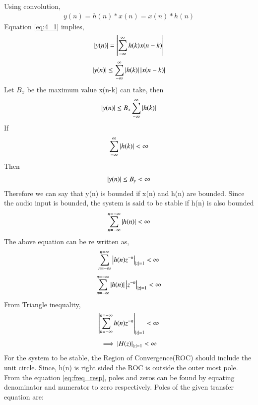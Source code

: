 \documentclass[journal,12pt,twocolumn]{IEEEtran}
\renewcommand\thesection{\arabic{section}}
\begin{document}
\begin{enumerate}[label=\thesection.\arabic*,ref=\thesection.\theenumi]
\begin{equation}
\label{eq:4_1}
\end{equation}
Using convolution,
\begin{align}
y(n)=h(n) * x(n) = x(n) * h(n)
\end{align}
Equation \eqref{eq:4_1} implies,
\begin{equation}
\left\vert y(n)\right\vert = \left\vert\sum_{-\infty}^{\infty} h(k)x(n-k)\right\vert
\end{equation}
\begin{equation}
\left\vert y(n)\right\vert \leq \sum_{-\infty}^{\infty} \left\vert h(k)\right\vert\left\vert x(n-k)\right\vert
\end{equation}
Let $B_{x}$ be the maximum value x(n-k) can take, then
\begin{equation}
\left\vert y(n)\right\vert \leq B_{x}\sum_{-\infty}^{\infty} \left\vert h(k)\right\vert
\end{equation}
If
\begin{equation}
\sum_{-\infty}^{\infty} \left\vert h(k)\right\vert < \infty
\end{equation}
Then
\begin{equation}
\left\vert y(n)\right\vert \leq B_{y} < \infty
\end{equation}
Therefore we can say that y(n) is bounded if x(n) and h(n) are bounded.
Since the audio input is bounded, the system is said to be stable if h(n) is also bounded
\begin{equation}
\sum_{n=-\infty}^{n=-\infty} \left\vert h(n)\right\vert<\infty
\end{equation}
The above equation can be re written as,
\begin{equation}
\sum_{n=-\infty}^{n=\infty} \left\vert h(n)z^{-n}\right\vert_{\left\vert z\right\vert=1}<\infty
\end{equation}
\begin{equation}
\sum_{n=-\infty}^{n=-\infty} \left\vert h(n)\right\vert \left\vert z^{-n}\right\vert_{\left\vert z\right\vert=1}<\infty
\end{equation}
From Triangle inequality,
\begin{equation}
\left\vert\sum_{n=-\infty}^{n=-\infty} h(n)z^{-n}\right\vert_{\left\vert z\right\vert=1}<\infty
\end{equation}
\begin{equation}
\implies \left\vert H(z)\right\vert_{\left\vert z\right\vert=1} < \infty
\end{equation}
For the system to be stable, the Region of Convergence(ROC) should include the unit circle.
Since, h(n) is right sided the ROC is outside the outer most pole. From the equation \eqref{eq:freq_resp}, poles and zeros can be found by equating denominator and numerator to zero respectively.
Poles of the given transfer equation are:
\begin{equation}
\begin{split}

\end{split}
\end{equation}
\end{enumerate}
\end{document}

